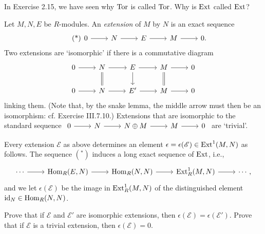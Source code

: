 \documentclass[../../master.tex]{subfiles}
\begin{document}
\begin{problem}
    In Exercise 2.15, we have seen why $\operatorname{Tor}$ is called $\operatorname{Tor}$.
    Why is $\operatorname{Ext}$ called $\operatorname{Ext}$?

    Let $M, N, E$ be $R$-modules.
    An \textit{extension} of $M$ by $N$ is an exact sequence
    \[
        \tag{*}
        \begin{tikzcd}
            0 & N & E & M & 0.
            \arrow[from=1-1, to=1-2]
            \arrow[from=1-2, to=1-3]
            \arrow[from=1-3, to=1-4]
            \arrow[from=1-4, to=1-5] 
        \end{tikzcd}
    \]
    Two extensions are `isomorphic' if there is a commutative diagram
    \[
        \begin{tikzcd}
            0 & N & E & M & 0 \\
            0 & N & E' & M & 0
            \arrow[from=1-1, to=1-2]
            \arrow[from=1-2, to=1-3]
            \arrow[from=1-3, to=1-4]
            \arrow[from=1-4, to=1-5] 
            \arrow[from=2-1, to=2-2]
            \arrow[from=2-2, to=2-3]
            \arrow[from=2-3, to=2-4]
            \arrow[from=2-4, to=2-5] 
            \arrow[from=1-2, to=2-2, equal] 
            \arrow[from=1-3, to=2-3]
            \arrow[from=1-4, to=2-4, equal] 
        \end{tikzcd}
    \]
    linking them.
    (Note that, by the snake lemma, the middle arrow must then be an isomorphism:
    cf. Exercise III.7.10.)
    Extensions that are isomorphic to the standard sequence 
    $
    \begin{tikzcd}
        0 & N & N \oplus M & M & 0
        \arrow[from=1-1, to=1-2]
        \arrow[from=1-2, to=1-3]
        \arrow[from=1-3, to=1-4]
        \arrow[from=1-4, to=1-5] 
    \end{tikzcd}$
    are `trivial'.

    Every extension $\mathscr{E}$ as above determines an element $\epsilon = \epsilon(\mathscr{E}) \in \operatorname{Ext}^{1}(M, N)$ as follows.
    The sequence $(^{*})$ induces a long exact sequence of $\operatorname{Ext}$, i.e.,
    \[
    \begin{tikzcd}
        \cdots & \Hom_R(E, N) & \Hom_R(N, N) & \Ext_R^{1}(M, N) & \cdots,
        \arrow[from=1-1, to=1-2]
        \arrow[from=1-2, to=1-3]
        \arrow[from=1-3, to=1-4]
        \arrow[from=1-4, to=1-5] 
    \end{tikzcd}
    \]
    and we let $\epsilon(\mathscr{E})$ be the image in $\operatorname{Ext}_R^{1}(M, N)$ of the distinguished element $\operatorname{id}_N \in \operatorname{Hom}_R(N, N)$.

    Prove that if $\mathscr{E}$ and $\mathscr{E}'$ are isomorphic extensions, then $\epsilon(\mathscr{E}) = \epsilon(\mathscr{E}')$.
    Prove that if $\mathscr{E}$ is a trivial extension, then $\epsilon(\mathscr{E}) = 0$.
\end{problem}
\end{document}
